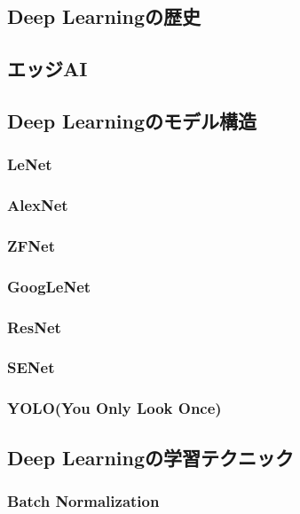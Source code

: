 \subsection{Deep Learningの歴史}


\subsection{エッジAI}


\subsection{Deep Learningのモデル構造}
\subsubsection{LeNet}


\subsubsection{AlexNet}


\subsubsection{ZFNet}


\subsubsection{GoogLeNet}


\subsubsection{ResNet}


\subsubsection{SENet}


\subsubsection{YOLO(You Only Look Once)}


\subsection{Deep Learningの学習テクニック}
\subsubsection{Batch Normalization}


